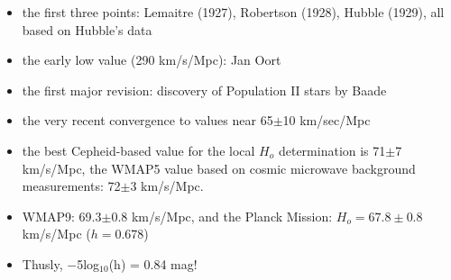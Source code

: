 \documentclass[letterpaper,landscape]{slides}
\begin{document}
\begin{slide}
{\begin{minipage}[t]{14cm}
\begin{itemize}
\item the first three points: Lemaitre (1927), Robertson (1928), Hubble (1929), all 
          based on Hubble's data
\item the early low value (290 km/s/Mpc): Jan Oort
\item the first major revision: discovery of Population II stars by Baade
\item the very recent convergence to values near 65$\pm$10 km/sec/Mpc 
\item the best Cepheid-based value for the local $H_o$ determination is 71$\pm$7 km/s/Mpc,
      the WMAP5 value based on cosmic microwave background measurements: 72$\pm$3 km/s/Mpc. 
\item WMAP9: 69.3$\pm$0.8 km/s/Mpc, and the Planck Mission: {\color{red} $H_o = 67.8 \pm 0.8$ km/s/Mpc}  ($h=0.678$) 
\item Thusly, $-$5log$_{10}$(h) = 0.84 mag! 
\end{itemize}
\end{minipage}}
\vfill 
\end{slide}
\end{document}
